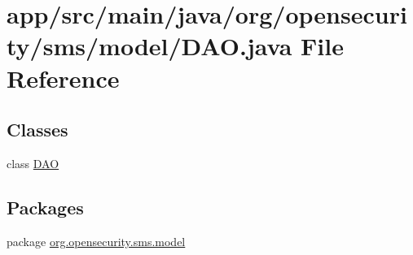 \hypertarget{a00018}{\section{app/src/main/java/org/opensecurity/sms/model/\+D\+A\+O.java File Reference}
\label{a00018}
}
\subsection*{Classes}
\begin{DoxyCompactItemize}
\item 
class \hyperlink{a00009}{D\+A\+O}
\end{DoxyCompactItemize}
\subsection*{Packages}
\begin{DoxyCompactItemize}
\item 
package \hyperlink{a00036}{org.\+opensecurity.\+sms.\+model}
\end{DoxyCompactItemize}

